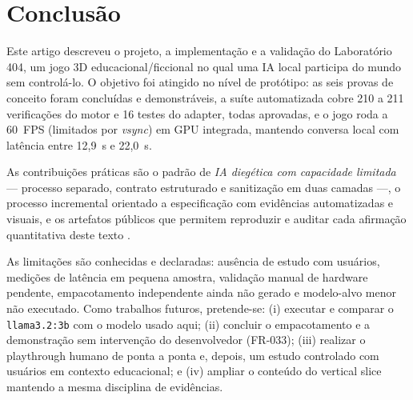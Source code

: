 \section{Conclusão}
\label{sec:conclusao}

Este artigo descreveu o projeto, a implementação e a validação do Laboratório
404, um jogo 3D educacional/ficcional no qual uma IA local participa do mundo
sem controlá-lo. O objetivo foi atingido no nível de protótipo: as seis provas
de conceito foram concluídas e demonstráveis, a suíte automatizada cobre 210 a
211 verificações do motor e 16 testes do adapter, todas aprovadas, e o jogo
roda a 60~FPS (limitados por \emph{vsync}) em GPU integrada, mantendo conversa
local com latência entre 12,9~s e 22,0~s.

As contribuições práticas são o padrão de \emph{IA diegética com capacidade
limitada} --- processo separado, contrato estruturado e sanitização em duas
camadas ---, o processo incremental orientado a especificação com evidências
automatizadas e visuais, e os artefatos públicos que permitem reproduzir e
auditar cada afirmação quantitativa deste texto \citep{lab404repo,lab404video}.

As limitações são conhecidas e declaradas: ausência de estudo com usuários,
medições de latência em pequena amostra, validação manual de hardware
pendente, empacotamento independente ainda não gerado e modelo-alvo menor não
executado. Como trabalhos futuros, pretende-se: (i) executar e comparar o
\texttt{llama3.2:3b} com o modelo usado aqui; (ii) concluir o empacotamento e a
demonstração sem intervenção do desenvolvedor (FR-033); (iii) realizar o
playthrough humano de ponta a ponta e, depois, um estudo controlado com
usuários em contexto educacional; e (iv) ampliar o conteúdo do vertical slice
mantendo a mesma disciplina de evidências.
